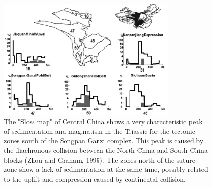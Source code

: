 \documentclass{article}
\begin{document}
 \begin{figure}[here]
 \begin{center}
 \includegraphics[width=0.8\textwidth]{centraltris.jpg}
 \caption{
 The "Sloss map" of Central  China shows a very characteristic peak of
 sedimentation and  magmatism in the  Triassic for the  tectonic zones
 south  of the  Songpan Ganzi  complex.  This  peak is  caused  by the
 diachronous collision between the  North China and South China blocks
 (Zhou and  Graham, 1996). The zones  north of the suture  zone show a
 lack  of sedimentation  at the  same  time, possibly  related to  the
 uplift   and    compression   caused   by    continental   collision.
 }\label{fig:central}
 \end{center}
 \end{figure}
\end{document}
